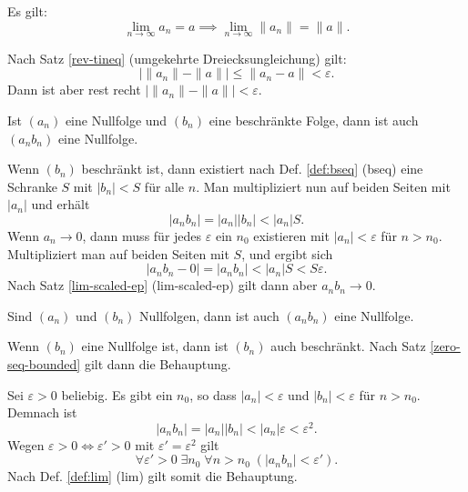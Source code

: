 \begin{Satz}
Es gilt:
\[\lim_{n\to\infty} a_n = a\implies \lim_{n\to\infty} \|a_n\| = \|a\|.\]
\end{Satz}

\begin{Beweis}
Nach Satz \ref{rev-tineq} (umgekehrte Dreiecksungleichung) gilt:
\[|\|a_n\|-\|a\|| \le \|a_n-a\| < \varepsilon.\]
Dann ist aber rest recht $|\|a_n\|-\|a\||<\varepsilon$.\,\qedsymbol
\end{Beweis}

\begin{Satz}\label{zero-seq-bounded}
Ist $(a_n)$ eine Nullfolge und $(b_n)$ eine beschränkte Folge,
dann ist auch $(a_n b_n)$ eine Nullfolge.
\end{Satz}

\begin{Beweis}
Wenn $(b_n)$ beschränkt ist, dann existiert nach
Def. \ref{def:bseq} (bseq) eine Schranke $S$ mit
$|b_n|<S$ für alle $n$. Man multipliziert nun auf beiden Seiten
mit $|a_n|$ und erhält
\[|a_n b_n| = |a_n| |b_n| < |a_n| S.\]
Wenn $a_n\to 0$, dann muss für jedes $\varepsilon$
ein $n_0$ existieren mit $|a_n|<\varepsilon$ für $n>n_0$.
Multipliziert man auf beiden Seiten mit $S$, und ergibt sich
\[|a_n b_n-0| = |a_n b_n| < |a_n| S < S\varepsilon.\]
Nach Satz \ref{lim-scaled-ep} (lim-scaled-ep) gilt dann
aber $a_n b_n\to 0$.\,\qedsymbol
\end{Beweis}

\begin{Satz}
Sind $(a_n)$ und $(b_n)$ Nullfolgen,
dann ist auch $(a_n b_n)$ eine Nullfolge.
\end{Satz}

\begin{Beweis}[Beweis 1]
Wenn $(b_n)$ eine Nullfolge ist, dann ist $(b_n)$ auch beschränkt.
Nach Satz \ref{zero-seq-bounded} gilt dann die Behauptung.
\end{Beweis}

\begin{Beweis}[Beweis 2]
Sei $\varepsilon>0$ beliebig.
Es gibt ein $n_0$, so dass
$|a_n|<\varepsilon$ und $|b_n|<\varepsilon$ für $n>n_0$.
Demnach ist
\[|a_n b_n| = |a_n| |b_n|< |a_n|\varepsilon <\varepsilon^2.\]
Wegen $\varepsilon>0\iff\varepsilon'>0$ mit
$\varepsilon'=\varepsilon^2$ gilt
\[\forall\varepsilon'{>}0\;\exists n_0\;\forall n{>}n_0\;
(|a_n b_n|<\varepsilon').\]
Nach Def. \ref{def:lim} (lim) gilt somit die Behauptung.\,\qedsymbol
\end{Beweis}

